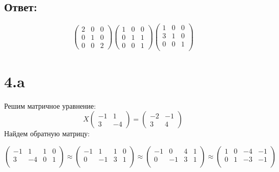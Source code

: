 \documentclass[a4paper]{article}
\begin{document}
\subsection*{Ответ:}
\begin{equation*}
\begin{pmatrix}
2 & 0 & 0\\
0 & 1 & 0\\
0 & 0 & 2
\end{pmatrix}
\begin{pmatrix}
1 & 0 & 0\\
0 & 1 & 1\\
0 & 0 & 1
\end{pmatrix}
\begin{pmatrix}
1 & 0 & 0\\
3 & 1 & 0\\
0 & 0 & 1\\
\end{pmatrix}
\end{equation*}

\section*{4.a}

Решим матричное уравнение:
\begin{equation*}
X\begin{pmatrix}
-1 & 1 \\
3 & -4
\end{pmatrix}
= 
\begin{pmatrix}
-2 & -1 \\
3 & 4
\end{pmatrix}
\end{equation*}
Найдем обратную матрицу:

\begin{equation*}
 \left(\begin{array}{rr|rr}
   -1 & 1 & 1 & 0\\
   3 & -4 & 0 & 1\\
   \end{array}\right)
   \approx
   \left(\begin{array}{rr|rr}
   -1 & 1 & 1 & 0\\
   0 & -1 & 3 & 1\\
   \end{array}\right)
\approx
   \left(\begin{array}{rr|rr}
   -1 & 0 & 4 & 1\\
   0 & -1 & 3 & 1\\
   \end{array}\right)
  \approx
      \left(\begin{array}{rr|rr}
   1 & 0 & -4 & -1\\
   0 & 1 & -3 & -1\\
   \end{array}\right)
\end{equation*}
\end{document}
